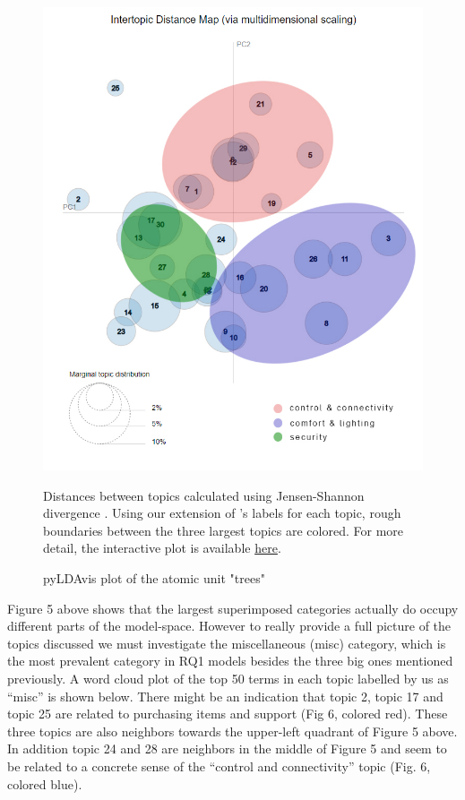 \documentclass{article}
\begin{document}
    \begin{figure}[H]
        \begin{centering}
        \includegraphics[width = \textwidth]{../Figure/pyLDAvis_edit.jpg}
        \caption{pyLDAvis plot of the atomic unit "trees"}
        \end{centering}
        \begin{footnotesize} 
            Distances between topics calculated using Jensen-Shannon divergence \cite{sievert2014ldavis}. Using our extension of 's labels for each topic, rough boundaries between the three largest topics are colored. For more detail, the interactive plot is available \href{https://tinyurl.com/y9ncgo5b}{here}.
        \end{footnotesize}
    \end{figure}
    
Figure 5 above shows that the largest superimposed categories actually do occupy different parts of the model-space. However to really provide a full picture of the topics discussed we must investigate the miscellaneous (misc) category, which is the most prevalent category in RQ1 models besides the three big ones mentioned previously. A word cloud plot of the top 50 terms in each topic labelled by us as “misc” is shown below. There might be an indication that topic 2, topic 17 and topic 25 are related to purchasing items and support (Fig 6, colored red). These three topics are also neighbors towards the upper-left quadrant of Figure 5 above. In addition topic 24 and 28 are neighbors in the middle of Figure 5 and seem to be related to a concrete sense of the “control and connectivity” topic (Fig. 6, colored blue). 
\end{document}
